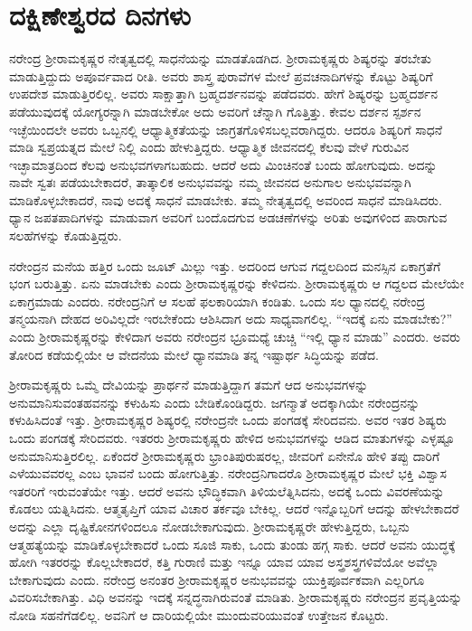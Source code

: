 
\chapter{ದಕ್ಷಿಣೇಶ್ವರದ ದಿನಗಳು}

ನರೇಂದ್ರ ಶ‍್ರೀರಾಮಕೃಷ್ಣರ ನೇತೃತ್ವದಲ್ಲಿ ಸಾಧನೆಯನ್ನು ಮಾಡತೊಡಗಿದ. ಶ‍್ರೀರಾಮಕೃಷ್ಣರು ಶಿಷ್ಯರನ್ನು ತರಬೇತು ಮಾಡುತ್ತಿದ್ದುದು ಅಪೂರ್ವವಾದ ರೀತಿ. ಅವರು ಶಾಸ್ತ್ರ ಪುರಾವೆಗಳ ಮೇಲೆ ಪ್ರವಚನಾದಿಗಳನ್ನು ಕೊಟ್ಟು ಶಿಷ್ಯರಿಗೆ ಉಪದೇಶ ಮಾಡುತ್ತಿರಲಿಲ್ಲ. ಅವರು ಸಾಕ್ಷಾತ್ತಾಗಿ ಬ್ರಹ್ಮದರ್ಶನವನ್ನು ಪಡೆದವರು. ಹೇಗೆ ಶಿಷ್ಯರನ್ನು ಬ್ರಹ್ಮದರ್ಶನ ಪಡೆಯುವುದಕ್ಕೆ ಯೋಗ್ಯರನ್ನಾಗಿ ಮಾಡಬೇಕೋ ಅದು ಅವರಿಗೆ ಚೆನ್ನಾಗಿ ಗೊತ್ತಿತ್ತು. ಕೇವಲ ದರ್ಶನ ಸ್ಪರ್ಶನ ಇಚ್ಛೆಯಿಂದಲೇ ಅವರು ಒಬ್ಬನಲ್ಲಿ ಆಧ್ಯಾತ್ಮಿಕತೆಯನ್ನು ಜಾಗ್ರತಗೊಳಿಸಬಲ್ಲವರಾಗಿದ್ದರು. ಆದರೂ ಶಿಷ್ಯರಿಗೆ ಸಾಧನೆ ಮಾಡಿ ಸ್ವಪ್ರಯತ್ನದ ಮೇಲೆ ನಿಲ್ಲಿ ಎಂದು ಹೇಳುತ್ತಿದ್ದರು. ಆಧ್ಯಾತ್ಮಿಕ ಜೀವನದಲ್ಲಿ ಕೆಲವು ವೇಳೆ ಗುರುವಿನ ಇಚ್ಛಾಮಾತ್ರದಿಂದ ಕೆಲವು ಅನುಭವಗಳಾಗಬಹುದು. ಆದರೆ ಅದು ಮಿಂಚಿನಂತೆ ಬಂದು ಹೋಗುವುದು. ಅದನ್ನು ನಾವೇ ಸ್ವತಃ ಪಡೆಯಬೇಕಾದರೆ, ತಾತ್ಕಾಲಿಕ ಅನುಭವವನ್ನು ನಮ್ಮ ಜೀವನದ ಅನುಗಾಲ ಅನುಭವವನ್ನಾಗಿ ಮಾಡಿಕೊಳ್ಳಬೇಕಾದರೆ, ನಾವು ಅದಕ್ಕೆ ಸಾಧನೆ ಮಾಡಬೇಕು. ತಮ್ಮ ನೇತೃತ್ವದಲ್ಲಿ ಅವರಿಂದ ಸಾಧನೆ ಮಾಡಿಸಿದರು. ಧ್ಯಾನ ಜಪತಪಾದಿಗಳನ್ನು ಮಾಡುವಾಗ ಅವರಿಗೆ ಬಂದೊದಗುವ ಅಡಚಣೆಗಳನ್ನು ಅರಿತು ಅವುಗಳಿಂದ ಪಾರಾಗುವ ಸಲಹೆಗಳನ್ನು ಕೊಡುತ್ತಿದ್ದರು.

ನರೇಂದ್ರನ ಮನೆಯ ಹತ್ತಿರ ಒಂದು ಜೂಟ್ ಮಿಲ್ಲು ಇತ್ತು. ಅದರಿಂದ ಆಗುವ ಗದ್ದಲದಿಂದ ಮನಸ್ಸಿನ ಏಕಾಗ್ರತೆಗೆ ಭಂಗ ಬರುತ್ತಿತ್ತು. ಏನು ಮಾಡಬೇಕು ಎಂದು ಶ‍್ರೀರಾಮಕೃಷ್ಣರನ್ನು ಕೇಳಿದನು. ಶ‍್ರೀರಾಮಕೃಷ್ಣರು ಆ ಗದ್ದಲದ ಮೇಲೆಯೇ ಏಕಾಗ್ರಮಾಡು ಎಂದರು. ನರೇಂದ್ರನಿಗೆ ಆ ಸಲಹೆ ಫಲಕಾರಿಯಾಗಿ ಕಂಡಿತು. ಒಂದು ಸಲ ಧ್ಯಾನದಲ್ಲಿ ನರೇಂದ್ರ ತನ್ಮಯನಾಗಿ ದೇಹದ ಅರಿವಿಲ್ಲದೇ ಇರಬೇಕೆಂದು ಆಶಿಸಿದಾಗ ಅದು ಸಾಧ್ಯವಾಗಲಿಲ್ಲ. “ಇದಕ್ಕೆ ಏನು ಮಾಡಬೇಕು?” ಎಂದು ಶ‍್ರೀರಾಮಕೃಷ್ಣರನ್ನು ಕೇಳಿದಾಗ ಅವರು ನರೇಂದ್ರನ ಭ್ರೂಮಧ್ಯೆ ಚುಚ್ಚಿ “ಇಲ್ಲಿ ಧ್ಯಾನ ಮಾಡು” ಎಂದರು. ಅವರು ತೋರಿದ ಕಡೆಯಲ್ಲಿಯೇ ಆ ವೇದನೆಯ ಮೇಲೆ ಧ್ಯಾನಮಾಡಿ ತನ್ನ ಇಷ್ಟಾರ್ಥ ಸಿದ್ಧಿಯನ್ನು ಪಡೆದ.

ಶ‍್ರೀರಾಮಕೃಷ್ಣರು ಒಮ್ಮೆ ದೇವಿಯನ್ನು ಪ್ರಾರ್ಥನೆ ಮಾಡುತ್ತಿದ್ದಾಗ ತಮಗೆ ಆದ ಅನುಭವಗಳನ್ನು ಅನುಮಾನಿಸುವಂತಹವನನ್ನು ಕಳುಹಿಸು ಎಂದು ಬೇಡಿಕೊಂಡಿದ್ದರು. ಜಗನ್ಮಾತೆ ಅದಕ್ಕಾಗಿಯೇ ನರೇಂದ್ರನನ್ನು ಕಳುಹಿಸಿದಂತೆ ಇತ್ತು. ಶ‍್ರೀರಾಮಕೃಷ್ಣರ ಶಿಷ್ಯರಲ್ಲಿ ನರೇಂದ್ರನೇ ಒಂದು ಪಂಗಡಕ್ಕೆ ಸೇರಿದವನು. ಅವರ ಇತರ ಶಿಷ್ಯರು ಒಂದು ಪಂಗಡಕ್ಕೆ ಸೇರಿದವರು. ಇತರರು ಶ‍್ರೀರಾಮಕೃಷ್ಣರು ಹೇಳಿದ ಅನುಭವಗಳನ್ನು ಆಡಿದ ಮಾತುಗಳನ್ನು ಎಳ್ಳಷ್ಟೂ ಅನುಮಾನಿಸುತ್ತಿರಲಿಲ್ಲ. ಏಕೆಂದರೆ ಶ‍್ರೀರಾಮಕೃಷ್ಣರು ಭ್ರಾಂತಿಪುರುಷರಲ್ಲ, ಜೀವರಿಗೆ ಏನೇನೊ ಹೇಳಿ ತಪ್ಪು ದಾರಿಗೆ ಎಳೆಯುವವರಲ್ಲ ಎಂಬ ಭಾವನೆ ಬಂದು ಹೋಗುತ್ತಿತ್ತು. ನರೇಂದ್ರನಿಗಾದರೊ ಶ‍್ರೀರಾಮಕೃಷ್ಣರ ಮೇಲೆ ಭಕ್ತಿ ವಿಶ್ವಾಸ ಇತರರಿಗೆ ಇರುವಂತೆಯೇ ಇತ್ತು. ಆದರೆ ಅವನು ಭೌದ್ಧಿಕವಾಗಿ ತಿಳಿಯಲೆತ್ನಿಸಿದನು, ಅದಕ್ಕೆ ಒಂದು ವಿವರಣೆಯನ್ನು ಕೊಡಲು ಯತ್ನಿಸಿದನು. ಆತ್ಮತೃಪ್ತಿಗೆ ಯಾವ ವಿಚಾರ ತರ್ಕವೂ ಬೇಕಿಲ್ಲ. ಆದರೆ ಇನ್ನೊಬ್ಬರಿಗೆ ಆದನ್ನು ಹೇಳಬೇಕಾದರೆ ಅದನ್ನು ಎಲ್ಲಾ ದೃಷ್ಟಿಕೋನಗಳಿಂದಲೂ ನೋಡಬೇಕಾಗುವುದು. ಶ‍್ರೀರಾಮಕೃಷ್ಣರೇ ಹೇಳುತ್ತಿದ್ದರು, ಒಬ್ಬನು ಆತ್ಮಹತ್ಯೆಯನ್ನು ಮಾಡಿಕೊಳ್ಳಬೇಕಾದರೆ ಒಂದು ಸೂಜಿ ಸಾಕು, ಒಂದು ತುಂಡು ಹಗ್ಗ ಸಾಕು. ಆದರೆ ಅವನು ಯುದ್ಧಕ್ಕೆ ಹೋಗಿ ಇತರರನ್ನು ಕೊಲ್ಲಬೇಕಾದರೆ, ಕತ್ತಿ ಗುರಾಣಿ ಮತ್ತು ಇನ್ನೂ ಯಾವ ಯಾವ ಅಸ್ತ್ರಶಸ್ತ್ರಗಳಿವೆಯೋ ಅವೆಲ್ಲಾ ಬೇಕಾಗುವುದು ಎಂದು. ನರೇಂದ್ರ ಅನಂತರ ಶ‍್ರೀರಾಮಕೃಷ್ಣರ ಅನುಭವವನ್ನು ಯುಕ್ತಿಪೂರ್ವಕವಾಗಿ ಎಲ್ಲರಿಗೂ ವಿವರಿಸಬೇಕಾಗಿತ್ತು. ವಿಧಿ ಅವನನ್ನು ಇದಕ್ಕೆ ಸನ್ನದ್ಧನಾಗಿರುವಂತೆ ಮಾಡಿತು. ಶ‍್ರೀರಾಮಕೃಷ್ಣರು ನರೇಂದ್ರನ ಪ್ರವೃತ್ತಿಯನ್ನು ನೋಡಿ ಸಹನೆಗೆಡಲಿಲ್ಲ. ಅವನಿಗೆ ಆ ದಾರಿಯಲ್ಲಿಯೇ ಮುಂದುವರಿಯುವಂತೆ ಉತ್ತೇಜನ ಕೊಟ್ಟರು.

